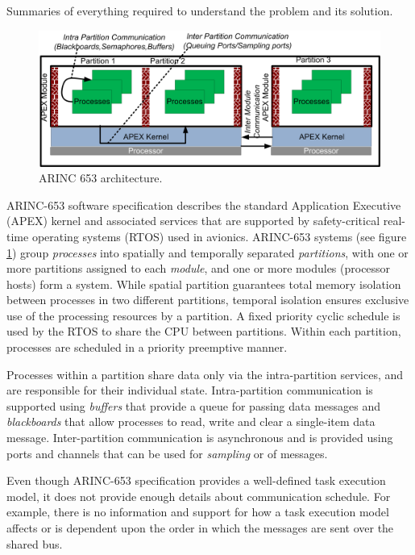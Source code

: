 
Summaries of everything required to understand the problem and its solution.

\begin{figure}[t]
    \centering
        \includegraphics[width=\columnwidth]{figures/ARINC653.png}
    \caption{ ARINC 653 architecture.}
    \label{fig:653}
\end{figure} 

ARINC-653 software specification describes the standard Application Executive (APEX) kernel and associated services that are supported by safety-critical real-time operating systems (RTOS) used in avionics. ARINC-653 systems (see figure \ref{fig:653}) group {\it processes} into spatially and temporally separated \textit{partitions}, with one or more partitions assigned to each \textit{module}, and one or more modules (processor hosts) form a system.  While spatial partition guarantees total memory isolation between processes in two different partitions, temporal isolation ensures exclusive use of the processing resources by a partition. A fixed priority cyclic schedule is used by the RTOS to share the CPU between partitions. Within each partition, processes are scheduled in a priority preemptive manner. 

Processes within a partition share data only via the intra-partition services, and are responsible for their individual state. Intra-partition communication is supported using \textit{buffers} that provide a queue for passing data messages and \textit{blackboards} that allow processes to read, write and clear a single-item data message.    Inter-partition communication is asynchronous and is provided using ports and channels that can be used for \textit{sampling} or  of messages. 

Even though ARINC-653 specification provides a well-defined task execution model, it does not provide enough details about communication schedule. For example, there is no information and support for how a task execution model affects or is dependent upon the order in which the messages are sent over the shared bus. 


